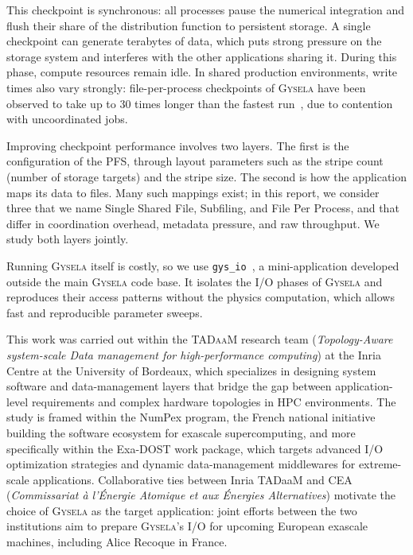 This checkpoint is synchronous: all processes pause the numerical integration and flush their
share of the distribution function to persistent storage. A single checkpoint can generate
terabytes of data, which puts strong pressure on the storage system and interferes with the other
applications sharing it. During this phase, compute resources remain idle. In shared production
environments, write times also vary strongly: file-per-process checkpoints of \textsc{Gysela} have
been observed to take up to 30 times longer than the fastest run~\cite{trochon2025checkpointing},
due to contention with uncoordinated jobs.

Improving checkpoint performance involves two layers. The first is the configuration of the PFS,
through layout parameters such as the stripe count (number of storage targets) and the stripe
size. The second is how the application maps its data to files. Many such mappings exist; in this
report, we consider three that we name Single Shared File, Subfiling, and File Per Process, and
that differ in coordination overhead, metadata pressure, and raw throughput. We study both layers
jointly.

Running \textsc{Gysela} itself is costly, so we use \texttt{gys\_io}~\cite{gysela_miniapp_io}, a
mini-application developed outside the main \textsc{Gysela} code base. It isolates the I/O phases
of \textsc{Gysela} and reproduces their access patterns without the physics computation, which
allows fast and reproducible parameter sweeps.

This work was carried out within the \textsc{TADaaM} research team (\textit{Topology-Aware system-scale Data
management for high-performance computing}) at the Inria Centre at the University of Bordeaux, which
specializes in designing system software and data-management layers that bridge the gap between application-level
requirements and complex hardware topologies in HPC environments. The study is framed within the NumPex program,
the French national initiative building the software ecosystem for exascale supercomputing, and more specifically within
the Exa-DOST work package, which targets advanced I/O optimization strategies and dynamic data-management middlewares
for extreme-scale applications. Collaborative ties between Inria TADaaM and CEA (\textit{Commissariat à l'Énergie Atomique et aux
Énergies Alternatives}) motivate the choice of \textsc{Gysela} as the target application: joint efforts between the two institutions
aim to prepare \textsc{Gysela}'s I/O for upcoming European exascale machines, including Alice Recoque in France.

